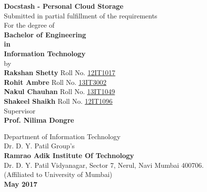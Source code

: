 \begin{center}
{\LARGE \bf Docstash - Personal Cloud Storage} \\
\vspace{0.1in}
\large Submitted in partial fulfillment of the requirements\\
For the degree of\\
\vspace{0.1in}
\Large{\bf{Bachelor of Engineering}}\\
\vspace{-0.2in}
{\bf in}\\
\vspace{-0.2in}
\Large{\bf{Information Technology}}\\
\vspace{0.1in}
\large by\\
\vspace{0.1in}
{\large \bf Rakshan Shetty} Roll No. \underline{12IT1017}\\
{\large \bf Rohit Ambre} Roll No. \underline{13IT3002}\\
{\large \bf Nakul Chauhan} Roll No. \underline{13IT1049}\\
{\large \bf Shakeel Shaikh} Roll No. \underline{12IT1096}\\
\vspace{0.2in}
\large Supervisor\\
\vspace{0.1in}
{ \normalsize \bf Prof. Nilima Dongre}\\
\vspace{-0.1in}
\begin{figure*}[h]
\centerline{}
\end{figure*}
\vspace{-0.1in}
\normalsize {Department of Information Technology}\\
\small Dr. D. Y. Patil Group's \\
\normalsize {\bf{Ramrao Adik Institute Of Technology}}\\
{\normalsize Dr. D. Y. Patil Vidyanagar, Sector 7, Nerul, Navi Mumbai 400706.}\\
\normalsize{(Affiliated to University of Mumbai)}\\
\large\textbf{May 2017}
\end{center}
